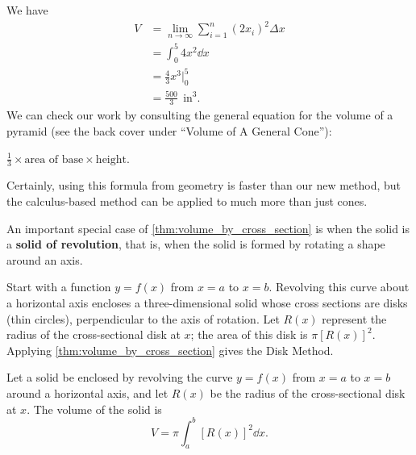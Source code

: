 \begin{example}
We have 
\begin{align*}
	V
	&= \lim_{n\to\infty} \sum_{i=1}^n (2x_i)^2\Delta x\\
	&= \int_0^5 4x^2\dd x\\
	&= \frac43x^3\Big|_0^5 \\
	&=\frac{500}{3}\ %
	\ \text{in}^3.
\end{align*}
We can check our work by consulting the general equation for the volume of a pyramid (see the back cover under ``Volume of A General Cone''): 
\begin{center}
$\frac13\times \text{area of base}\times \text{height}$.
\end{center}
Certainly, using this formula from geometry is faster than our new method, but the calculus-based method can be applied to much more than just cones.
\end{example}

An important special case of \autoref{thm:volume_by_cross_section} is when the solid is a \textbf{solid of revolution}, that is, when the solid is formed by rotating a shape around an axis.

Start with a function $y=f(x)$ from $x=a$ to $x=b$. Revolving this curve about a horizontal axis encloses a three-dimensional solid whose cross sections are disks (thin circles), perpendicular to the axis of rotation. Let $R(x)$ represent the radius of the cross-sectional disk at $x$; the area of this disk is $\pi [R(x)]^2$. Applying \autoref{thm:volume_by_cross_section} gives the Disk Method.

\begin{keyidea}\label{idea:disk_method}%
Let a solid be enclosed by revolving the curve $y=f(x)$ from $x=a$ to $x=b$ around a horizontal axis, and let $R(x)$ be the radius of the cross-sectional disk at $x$. The volume of the solid is
\[V = \pi \int_a^b [R(x)]^2\dd x.\]
\end{keyidea}


